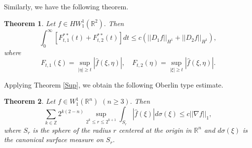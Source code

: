 \documentclass[12pt,twoside,reqno]{amsart}
\numberwithin{equation}{section}
\newtheorem{teo}{Theorem}[section]
\theoremstyle{definition}
\numberwithin{equation}{section}
\def\R{\mathbb{R}}
\def\Z{\mathbb{Z}}
\def\s{\sigma}
\begin{document}
Similarly, we have the following theorem.
\begin{teo}\label{SupH} Let $f\in HW_1^1(\R^2).$  Then
\begin{equation*}
\int_0^\infty [F_{t,1}^{**}(t)+F_{t,2}^{**}(t)]dt\le c (||D_1f||_{H^1}+||D_2f||_{H^1}),
\end{equation*}
where
$$
F_{t,1}(\xi)=\sup_{|\eta|\ge t}|\widehat f(\xi,\eta)|,\quad F_{t,2}(\eta)=\sup_{|\xi|\ge t}|\widehat f(\xi,\eta)|.
$$
\end{teo}


Applying Theorem \ref{Sup}, we obtain the following Oberlin type estimate.
\begin{teo}\label{Obertype1} Let $f\in W_1^1(\R^n)$ $(n\ge 3).$ Then
\begin{equation}\label{obertype1}
 \sum_{k\in\Z} 2^{k(2-n)}\sup_{2^{k}\le r\le 2^{k+1}}\int_{S_r} |\widehat f(\xi)| d\s(\xi)\le c ||\nabla f||_1,
\end{equation}
where $S_r$ is the sphere of the radius $r$ centered at the origin in $\R^n$ and $d\s(\xi)$ is the canonical surface measure on $S_r.$
\end{teo}
\end{document}
